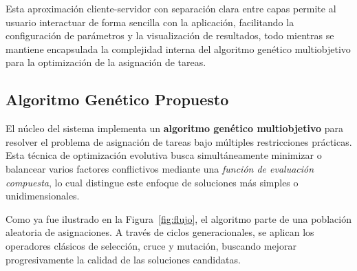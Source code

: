 Esta aproximación cliente-servidor con separación clara entre capas permite al usuario interactuar de forma sencilla con la aplicación, facilitando la configuración de parámetros y la visualización de resultados, todo mientras se mantiene encapsulada la complejidad interna del algoritmo genético multiobjetivo para la optimización de la asignación de tareas.

\subsection{Algoritmo Genético Propuesto}

El núcleo del sistema implementa un \textbf{algoritmo genético multiobjetivo} para resolver el problema de asignación de tareas bajo múltiples restricciones prácticas. Esta técnica de optimización evolutiva busca simultáneamente minimizar o balancear varios factores conflictivos mediante una \textit{función de evaluación compuesta}, lo cual distingue este enfoque de soluciones más simples o unidimensionales.

Como ya fue ilustrado en la Figura~\ref{fig:flujo}, el algoritmo parte de una población aleatoria de asignaciones. A través de ciclos generacionales, se aplican los operadores clásicos de selección, cruce y mutación, buscando mejorar progresivamente la calidad de las soluciones candidatas.

